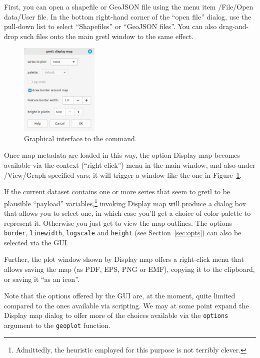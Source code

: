 \documentclass{article}
\begin{document}
First, you can open a shapefile or GeoJSON file using the menu item
\textsf{/File/Open data/User file}. In the bottom right-hand corner of
the ``open file'' dialog, use the pull-down list to select
``Shapefiles'' or ``GeoJSON files''. You can also drag-and-drop such
files onto the main gretl window to the same effect.

\begin{figure}[htbp]
  \begin{center}
    \includegraphics[width=0.333\textwidth]{geoplot_GUI.png}
  \end{center}
  \caption{Graphical interface to the  command.}
\label{fig:gui}
\end{figure}
Once map metadata are loaded in this way, the option \textsf{Display
  map} becomes available via the context (``right-click'') menu in the
main window, and also under \textsf{/View/Graph specified vars};
it will trigger a window like the one in Figure~\ref{fig:gui}.

If the current dataset contains one or more series that seem to gretl to
be plausible ``payload'' variables,\footnote{Admittedly, the heuristic
  employed for this purpose is not terribly clever.} invoking
\textsf{Display map} will produce a dialog box that allows you to
select one, in which case you'll get a choice of color palette to
represent it. Otherwise you just get to view the map outlines.  The
options \texttt{border}, \texttt{linewidth}, \texttt{logscale} and
\texttt{height} (see Section~\ref{sec:opts}) can also be selected via
the GUI.

Further, the plot window shown by \textsf{Display map} offers a
right-click menu that allows saving the map (as PDF, EPS, PNG or EMF),
copying it to the clipboard, or saving it ``as an icon''.

Note that the options offered by the GUI are, at the moment, quite
limited compared to the ones available via scripting. We may at some
point expand the \textsf{Display map} dialog to offer more of the
choices available via the \texttt{options} argument to the
\texttt{geoplot} function.
\end{document}
